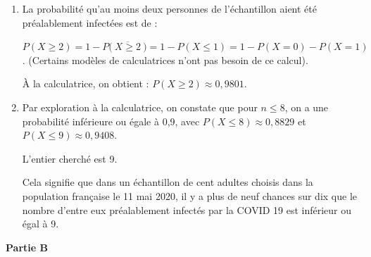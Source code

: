 \documentclass[10pt]{article}
\begin{document}
\begin{enumerate}
\begin{enumerate}
On a donc, ici : \quad $P(X = 0) = \displaystyle \binom{100}{0 }\times 0,057^0 \times 0,943^{100} = 0,943^{100} \approx 0,0028$.

		\item La probabilité qu'au moins deux personnes de l'échantillon aient été préalablement infectées est de :

$P(X \geqslant 2 ) = 1 - P\big(~\overline{X \geqslant 2}~\big) = 1 - P(X \leqslant 1) = 1 - P(X = 0) - P(X = 1)$. (Certains modèles de calculatrices n'ont pas besoin de ce calcul).

À la calculatrice, on obtient : \quad$P(X \geqslant 2) \approx 0,9801$.

		\item Par exploration à la calculatrice, on constate que pour $n \leqslant 8$, on a une probabilité inférieure ou égale à 0,9, avec $P(X \leqslant 8) \approx 0,8829$ et $P(X \leqslant 9) \approx 0,9408$.

L'entier cherché est 9.

Cela signifie que dans un échantillon de cent adultes choisis dans la population française le 11 mai 2020, il y a plus de neuf chances sur dix que le nombre d'entre eux préalablement infectés par la COVID 19 est inférieur ou égal à 9.
	\end{enumerate}
\end{enumerate}

\medskip
\textbf{Partie B}
\medskip
\end{document}
